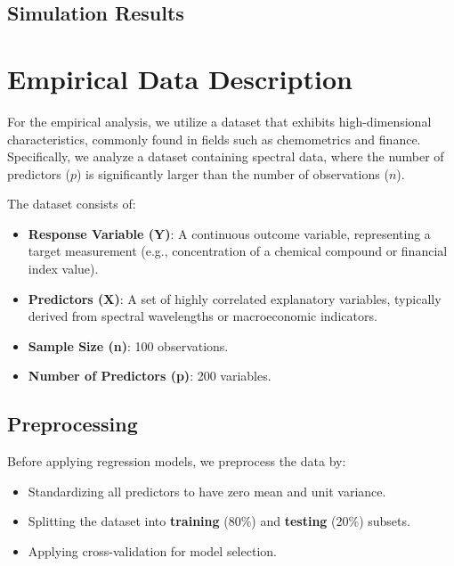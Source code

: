 \documentclass[11pt,twoside,a4paper]{article}
\begin{document}
\subsection{Simulation Results}



\section{Empirical Data Description}

For the empirical analysis, we utilize a dataset that exhibits high-dimensional characteristics, commonly found in fields such as chemometrics and finance. Specifically, we analyze a dataset containing spectral data, where the number of predictors (\(p\)) is significantly larger than the number of observations (\(n\)).

The dataset consists of:
\begin{itemize}
    \item \textbf{Response Variable (Y)}: A continuous outcome variable, representing a target measurement (e.g., concentration of a chemical compound or financial index value).
    \item \textbf{Predictors (X)}: A set of highly correlated explanatory variables, typically derived from spectral wavelengths or macroeconomic indicators.
    \item \textbf{Sample Size (n)}: 100 observations.
    \item \textbf{Number of Predictors (p)}: 200 variables.
\end{itemize}

\subsection{Preprocessing}
Before applying regression models, we preprocess the data by:
\begin{itemize}
    \item Standardizing all predictors to have zero mean and unit variance.
    \item Splitting the dataset into \textbf{training} (80\%) and \textbf{testing} (20\%) subsets.
    \item Applying cross-validation for model selection.
\end{itemize}



\printbibliography
\end{document}
